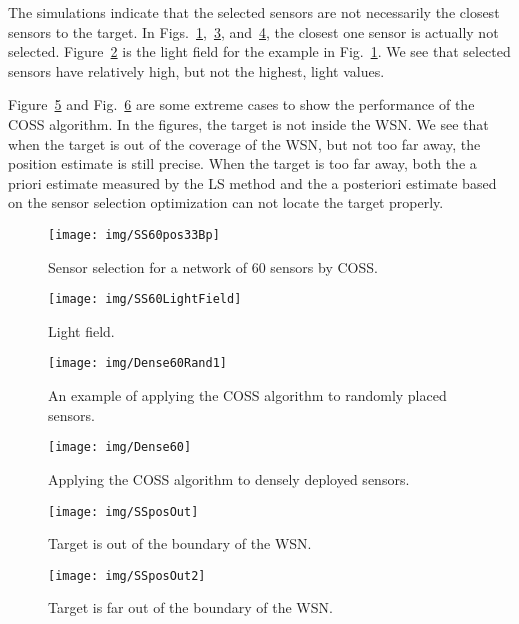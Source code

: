 The simulations indicate that the selected sensors are not necessarily the closest sensors to the target. In Figs.~\ref{f:SS60pos33},~\ref{f:SSRandPos}, and~\ref{f:dense}, the closest one sensor is actually not selected.
    Figure~\ref{f:lt} is the light field for the example in Fig.~\ref{f:SS60pos33}. We see that selected sensors have relatively high, but not the highest, light values.

Figure~\ref{f:SSposOut} and Fig.~\ref{f:SSposOut2} are some extreme cases to show the performance of the COSS algorithm. In the figures, the target is not inside the WSN. We see that when the target is out of the coverage of the WSN, but not too far away, the position estimate is still precise. When the target is too far away, both the a priori estimate measured by the LS method and the a posteriori estimate based on the sensor selection optimization can not locate the target properly.


\begin{figure}
  \centering
  \texttt{[image: img/SS60pos33Bp]}
  \caption{Sensor selection for a network of 60 sensors by COSS.}\label{f:SS60pos33}
\end{figure}

\begin{figure}
  \centering
  \texttt{[image: img/SS60LightField]}
  \caption{Light field.}\label{f:lt}
\end{figure}

\begin{figure}
  \centering
  \texttt{[image: img/Dense60Rand1]}
  \caption{An example of applying the COSS algorithm to randomly placed sensors.}\label{f:SSRandPos}
\end{figure}


\begin{figure}
  \centering
  \texttt{[image: img/Dense60]}
  \caption{Applying the COSS algorithm to densely deployed sensors.}\label{f:dense}
\end{figure}

\begin{figure}
  \centering
  \texttt{[image: img/SSposOut]}
  \caption{Target is out of the boundary of the WSN.}\label{f:SSposOut}
\end{figure}



\begin{figure}
  \centering
  \texttt{[image: img/SSposOut2]}
  \caption{Target is far out of the boundary of the WSN.}\label{f:SSposOut2}
\end{figure}


